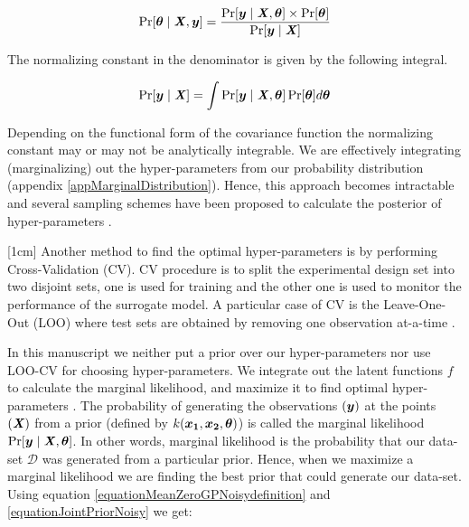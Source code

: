 \begin{equation}
    \Pr[\boldsymbol{\theta} \mid \bm{\mathit{X}}, \boldsymbol{y}] = \frac{\Pr[\boldsymbol{y} \mid \bm{\mathit{X}}, \boldsymbol{\theta}] \times \Pr[\boldsymbol{\theta}]}{\Pr[\boldsymbol{y} \mid \bm{\mathit{X}}]}
\end{equation}

The normalizing constant in the denominator is given by the following integral.

\begin{equation}
    \Pr[\boldsymbol{y} \mid \bm{\mathit{X}}] = \int \Pr[\boldsymbol{y} \mid \bm{\mathit{X}}, \boldsymbol{\theta}]\Pr[\boldsymbol{\theta}]d\boldsymbol{\theta}
\end{equation}

Depending on the functional form of the covariance function the normalizing constant may or may not be analytically integrable. We are effectively integrating (marginalizing) out the hyper-parameters from our probability distribution (appendix \ref{appMarginalDistribution}). Hence, this approach becomes intractable and several sampling schemes have been proposed to calculate the posterior of hyper-parameters \cite{osborne2010bayesian, neal2011mcmc}.

[1cm]
Another method to find the optimal hyper-parameters is by performing Cross-Validation (CV). CV procedure is to split the experimental design set into two disjoint sets, one is used for training and the other one is used to monitor the performance of the surrogate model. A particular case of CV is the Leave-One-Out (LOO) where test sets are obtained by removing one observation at-a-time \cite{Rasmussen2005, dubrule1983cross, le2013multi}. 

In this manuscript we neither put a prior over our hyper-parameters nor use LOO-CV for choosing hyper-parameters. We integrate out the latent functions $f$ to calculate the marginal likelihood, and maximize it to find optimal hyper-parameters \cite{mackay2003information}. The probability of generating the observations $(\boldsymbol{y})$ at the points $(\bm{\mathit{X}})$ from a prior (defined by $k(\boldsymbol{x_1}, \boldsymbol{x_2}, \boldsymbol{\theta})$) is called the marginal likelihood $\Pr[\boldsymbol{y} \mid \bm{\mathit{X}}, \boldsymbol{\theta}]$. In other words, marginal likelihood is the probability that our data-set $\mathcal{D}$ was generated from a particular prior. Hence, when we maximize a marginal likelihood we are finding the best prior that could generate our data-set. Using equation \ref{equationMeanZeroGPNoisydefinition} and \ref{equationJointPriorNoisy} we get:

